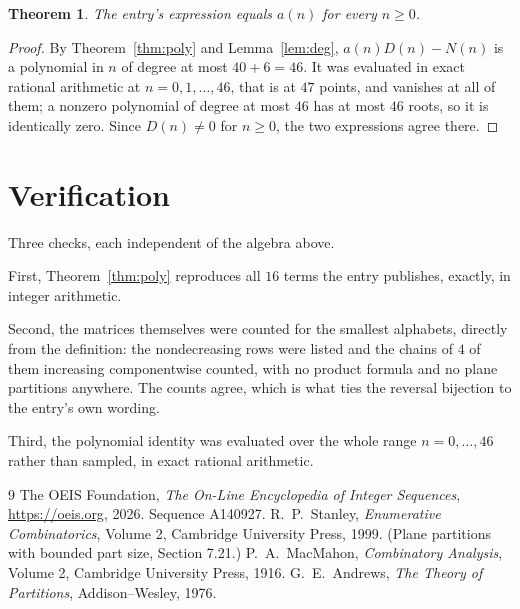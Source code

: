 \documentclass[11pt,a4paper]{article}
\theoremstyle{plain}
\newtheorem{theorem}{Theorem}
\theoremstyle{definition}
\begin{document}
\begin{theorem}
The entry's expression equals $a(n)$ for every $n\ge0$.
\end{theorem}

\begin{proof}
By Theorem~\ref{thm:poly} and Lemma~\ref{lem:deg}, $a(n)D(n)-N(n)$ is a polynomial in $n$
of degree at most $40+6=46$. It was evaluated in exact rational arithmetic at
$n=0,1,\dots,46$, that is at $47$ points, and vanishes at all of them; a nonzero polynomial
of degree at most $46$ has at most $46$ roots, so it is identically zero. Since $D(n)\neq0$
for $n\ge0$, the two expressions agree there.
\end{proof}

\section{Verification}

Three checks, each independent of the algebra above.

First, Theorem~\ref{thm:poly} reproduces all $16$ terms the entry publishes,
exactly, in integer arithmetic.

Second, the matrices themselves were counted for the smallest alphabets, directly from the
definition: the nondecreasing rows were listed and the chains of $4$ of them increasing
componentwise counted, with no product formula and no plane partitions anywhere. The counts
agree, which is what ties the reversal bijection to the entry's own wording.

Third, the polynomial identity was evaluated over the whole range $n=0,\dots,46$ rather than
sampled, in exact rational arithmetic.

\begin{thebibliography}{9}
 The OEIS Foundation, \emph{The On-Line Encyclopedia of Integer
Sequences}, \url{https://oeis.org}, 2026. Sequence A140927.
 R.~P.~Stanley, \emph{Enumerative Combinatorics}, Volume 2, Cambridge
University Press, 1999. (Plane partitions with bounded part size, Section 7.21.)
 P.~A.~MacMahon, \emph{Combinatory Analysis}, Volume 2, Cambridge
University Press, 1916.
 G.~E.~Andrews, \emph{The Theory of Partitions}, Addison--Wesley, 1976.
\end{thebibliography}
\end{document}
